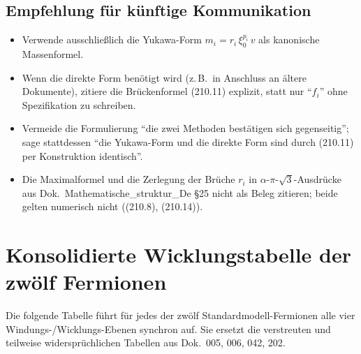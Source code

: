 \subsection*{Empfehlung für künftige Kommunikation}

\begin{itemize}
  \item Verwende ausschließlich die Yukawa-Form
        $m_i = r_i\,\xi_0^{p_i}\,v$ als kanonische Massenformel.
  \item Wenn die direkte Form benötigt wird (z.\,B.\ in Anschluss an
        ältere Dokumente), zitiere die Brückenformel (210.11)
        explizit, statt nur \enquote{$f_i$} ohne Spezifikation
        zu schreiben.
  \item Vermeide die Formulierung \enquote{die zwei Methoden
        bestätigen sich gegenseitig}; sage stattdessen
        \enquote{die Yukawa-Form und die direkte Form sind durch
        (210.11) per Konstruktion identisch}.
  \item Die Maximalformel und die Zerlegung der Brüche $r_i$ in
        $\alpha$-$\pi$-$\sqrt{3}$-Ausdrücke aus
        Dok.~Mathematische\_struktur\_De §25 nicht als Beleg
        zitieren; beide gelten numerisch nicht ((210.8), (210.14)).
\end{itemize}

\section{\texorpdfstring{Konsolidierte Wicklungstabelle der zwölf Fermionen}{Konsolidierte Wicklungstabelle der zwoelf Fermionen}}

Die folgende Tabelle führt für jedes der zwölf Standardmodell-Fermionen
alle vier Windungs-/Wicklungs-Ebenen synchron auf. Sie ersetzt die
verstreuten und teilweise widersprüchlichen Tabellen aus Dok.~005, 006,
042, 202.

